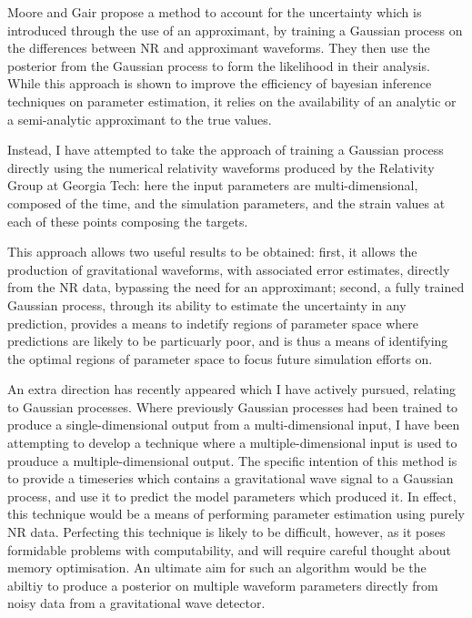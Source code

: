 \documentclass{kentigern}
\begin{document}
Moore and Gair\cite{2014PhRvL.113y1101M,2016PhRvD..93f4001M} propose a
method to account for the uncertainty which is introduced through the
use of an approximant, by training a Gaussian process on the
differences between NR and approximant waveforms. They then use the
posterior from the Gaussian process to form the likelihood in their
analysis. While this approach is shown to improve the efficiency of
bayesian inference techniques on parameter estimation, it relies on
the availability of an analytic or a semi-analytic approximant to the
true values.

Instead, I have attempted to take the approach of training a Gaussian
process directly using the numerical relativity waveforms produced by
the Relativity Group at Georgia Tech\cite{gatechcat}: here the input
parameters are multi-dimensional, composed of the time, and the
simulation parameters, and the strain values at each of these points
composing the targets.

This approach allows two useful results to be obtained: first, it
allows the production of gravitational waveforms, with associated
error estimates, directly from the NR data, bypassing the need for an
approximant; second, a fully trained Gaussian process, through its
ability to estimate the uncertainty in any prediction, provides a
means to indetify regions of parameter space where predictions are
likely to be particuarly poor, and is thus a means of identifying the
optimal regions of parameter space to focus future simulation efforts
on.

An extra direction has recently appeared which I have actively
pursued, relating to Gaussian processes. Where previously Gaussian
processes had been trained to produce a single-dimensional output from
a multi-dimensional input, I have been attempting to develop a
technique where a multiple-dimensional input is used to prouduce a
multiple-dimensional output. The specific intention of this method is
to provide a timeseries which contains a gravitational wave signal to
a Gaussian process, and use it to predict the model parameters which
produced it. In effect, this technique would be a means of performing
parameter estimation using purely NR data. Perfecting this technique
is likely to be difficult, however, as it poses formidable problems
with computability, and will require careful thought about memory
optimisation. An ultimate aim for such an algorithm would be the
abiltiy to produce a posterior on multiple waveform parameters
directly from noisy data from a gravitational wave detector.
\end{document}
